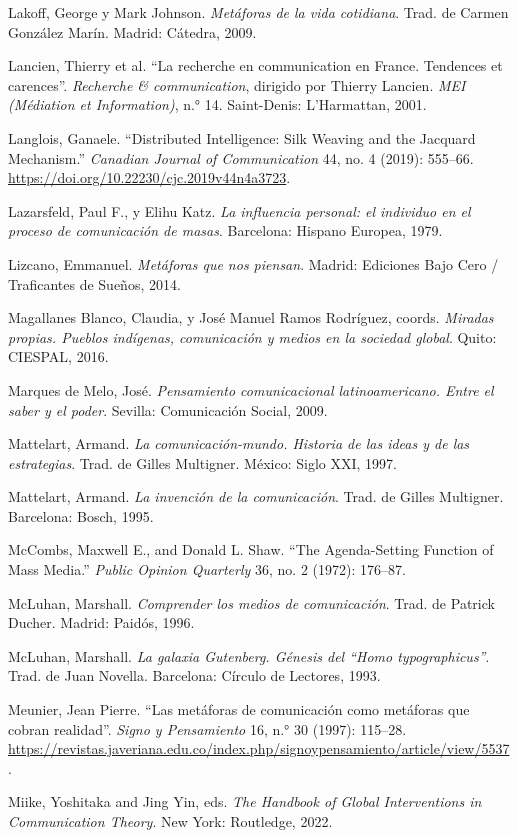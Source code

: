 \documentclass{tufte-handout}
\begin{document}
\begin{hangparas}{.25in}{1}
Lakoff, George y Mark Johnson. \emph{Metáforas de la vida cotidiana}.
Trad. de Carmen González Marín. Madrid: Cátedra, 2009.

Lancien, Thierry et al. ``La recherche en communication en France.
Tendences et carences''. \emph{Recherche \& communication}, dirigido por
Thierry Lancien. \emph{MEI} \emph{(Médiation et Information)}, n.° 14.
Saint-Denis: L'Harmattan, 2001.

Langlois, Ganaele. ``Distributed Intelligence: Silk Weaving and the
Jacquard Mechanism.'' \emph{Canadian Journal of Communication} 44, no. 4
(2019): 555--66. \url{https://doi.org/10.22230/cjc.2019v44n4a3723}.

Lazarsfeld, Paul F., y Elihu Katz. \emph{La influencia personal: el
individuo en el proceso de comunicación de masas}. Barcelona: Hispano
Europea, 1979.

Lizcano, Emmanuel. \emph{Metáforas que nos piensan}. Madrid: Ediciones
Bajo Cero / Traficantes de Sueños, 2014.

Magallanes Blanco, Claudia, y José Manuel Ramos Rodríguez, coords.
\emph{Miradas propias. Pueblos indígenas, comunicación y medios en la
sociedad global}. Quito: CIESPAL, 2016.

Marques de Melo, José. \emph{Pensamiento comunicacional latinoamericano.
Entre el saber y el poder}. Sevilla: Comunicación Social, 2009.

Mattelart, Armand. \emph{La comunicación-mundo. Historia de las ideas y
de las estrategias}. Trad. de Gilles Multigner. México: Siglo XXI, 1997.

Mattelart, Armand. \emph{La invención de la comunicación}. Trad. de
Gilles Multigner. Barcelona: Bosch, 1995.

McCombs, Maxwell E., and Donald L. Shaw. ``The Agenda-Setting Function
of Mass Media.'' \emph{Public Opinion Quarterly} 36, no. 2 (1972):
176--87.

McLuhan, Marshall. \emph{Comprender los medios de comunicación}. Trad.
de Patrick Ducher. Madrid: Paidós, 1996.

McLuhan, Marshall. \emph{La galaxia Gutenberg. Génesis del ``Homo
typographicus''}. Trad. de Juan Novella. Barcelona: Círculo de Lectores,
1993.

Meunier, Jean Pierre. ``Las metáforas de comunicación como metáforas que
cobran realidad''. \emph{Signo y Pensamiento} 16, n.° 30 (1997):
115--28.
\url{https://revistas.javeriana.edu.co/index.php/signoypensamiento/article/view/5537}.

Miike, Yoshitaka and Jing Yin, eds. \emph{The Handbook of Global
Interventions in Communication Theory}. New York: Routledge, 2022.


\end{hangparas}
\end{document}
